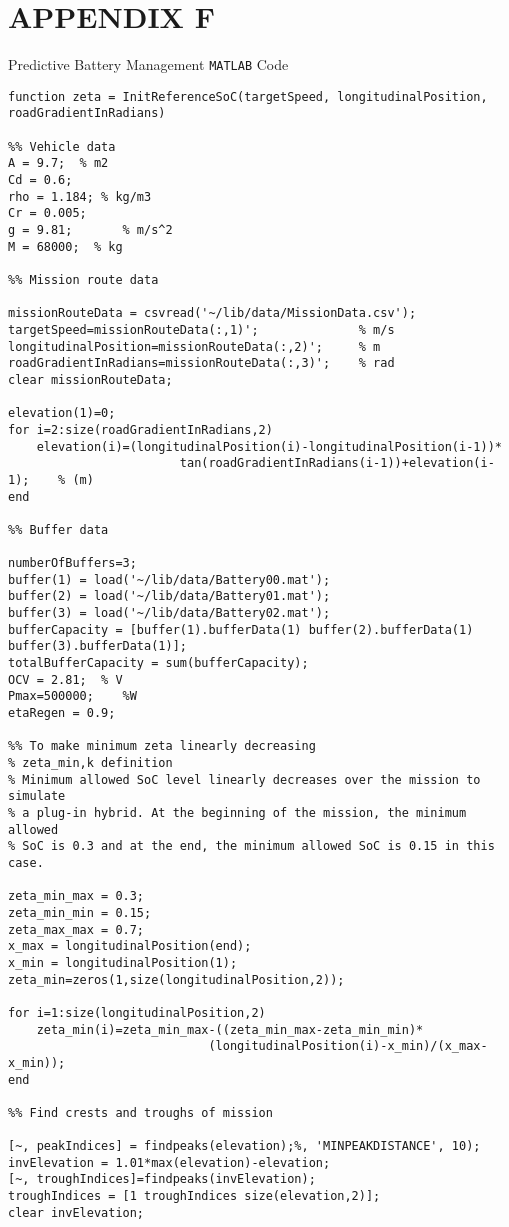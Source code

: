 \documentclass[ExampleMasters.tex]{subfiles}
\begin{document}
    \chapter{APPENDIX F}
    {\Large Predictive Battery Management \verb!MATLAB! Code}
        \begin{verbatim} 
function zeta = InitReferenceSoC(targetSpeed, longitudinalPosition, roadGradientInRadians)

%% Vehicle data
A = 9.7;  % m2
Cd = 0.6;
rho = 1.184; % kg/m3
Cr = 0.005;
g = 9.81;       % m/s^2
M = 68000;  % kg

%% Mission route data

missionRouteData = csvread('~/lib/data/MissionData.csv');            
targetSpeed=missionRouteData(:,1)';              % m/s
longitudinalPosition=missionRouteData(:,2)';     % m
roadGradientInRadians=missionRouteData(:,3)';    % rad
clear missionRouteData;

elevation(1)=0;
for i=2:size(roadGradientInRadians,2)
    elevation(i)=(longitudinalPosition(i)-longitudinalPosition(i-1))*
                        tan(roadGradientInRadians(i-1))+elevation(i-1);    % (m)
end

%% Buffer data

numberOfBuffers=3;
buffer(1) = load('~/lib/data/Battery00.mat');
buffer(2) = load('~/lib/data/Battery01.mat');
buffer(3) = load('~/lib/data/Battery02.mat');
bufferCapacity = [buffer(1).bufferData(1) buffer(2).bufferData(1) buffer(3).bufferData(1)];
totalBufferCapacity = sum(bufferCapacity);
OCV = 2.81;  % V
Pmax=500000;    %W
etaRegen = 0.9;

%% To make minimum zeta linearly decreasing
% zeta_min,k definition
% Minimum allowed SoC level linearly decreases over the mission to simulate
% a plug-in hybrid. At the beginning of the mission, the minimum allowed
% SoC is 0.3 and at the end, the minimum allowed SoC is 0.15 in this case.

zeta_min_max = 0.3;
zeta_min_min = 0.15;
zeta_max_max = 0.7;
x_max = longitudinalPosition(end);
x_min = longitudinalPosition(1);
zeta_min=zeros(1,size(longitudinalPosition,2));

for i=1:size(longitudinalPosition,2)
    zeta_min(i)=zeta_min_max-((zeta_min_max-zeta_min_min)*
                            (longitudinalPosition(i)-x_min)/(x_max-x_min));
end

%% Find crests and troughs of mission

[~, peakIndices] = findpeaks(elevation);%, 'MINPEAKDISTANCE', 10);
invElevation = 1.01*max(elevation)-elevation;
[~, troughIndices]=findpeaks(invElevation);
troughIndices = [1 troughIndices size(elevation,2)];
clear invElevation;


\end{verbatim}
\end{document}
